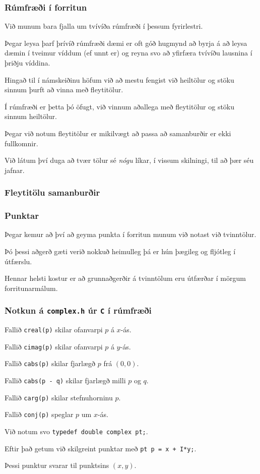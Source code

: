 {
	\frametitle{Rúmfræði í forritun}
	{
		\item<1-> Við munum bara fjalla um tvívíða rúmfræði í þessum fyrirlestri.
		\item<2-> Þegar leysa þarf þrívíð rúmfræði dæmi er oft góð hugmynd að byrja
			á að leysa dæmin í tveimur víddum (ef unnt er) og reyna svo að yfirfæra
			tvívíðu lausnina í þriðju víddina.  \item<3-> Hingað til í námskeiðinu höfum við að mestu fengist við heiltölur
			og stöku sinnum þurft að vinna með fleytitölur.
		\item<4-> Í rúmfræði er þetta þó öfugt, við vinnum aðallega með fleytitölur og stöku sinnum heiltölur.
		\item<5-> Þegar við notum fleytitölur er mikilvægt að passa að samanburðir er ekki fullkomnir.
		\item<6-> Við látum því duga að tvær tölur sé \emph{nógu} líkar, í vissum skilningi, til að þær séu jafnar.
	}
}

{
	\frametitle{Fleytitölu samanburðir}
}

{
	\frametitle{Punktar}
	{
		\item<1-> Þegar kemur að því að geyma punkta í forritun munum við notast við tvinntölur.
		\item<2-> Þó þessi aðgerð gæti verið nokkuð heimulleg þá er hún þægileg og fljótleg í útfærslu.
		\item<3-> Hennar helsti kostur er að grunnaðgerðir á tvinntölum eru útfærðar í mörgum forritunarmálum.
	}
}

{
	\frametitle{Notkun á \texttt{complex.h} úr \texttt{C} í rúmfræði}
	{
		\item<1-> Fallið \texttt{creal(p)} skilar ofanvarpi $p$ á $x$-ás.
		\item<2-> Fallið \texttt{cimag(p)} skilar ofanvarpi $p$ á $y$-ás.
		\item<3-> Fallið \texttt{cabs(p)} skilar fjarlægð $p$ frá $(0, 0)$.
		\item<4-> Fallið \texttt{cabs(p - q)} skilar fjarlægð milli $p$ og $q$.
		\item<5-> Fallið \texttt{carg(p)} skilar stefnuhorninu $p$.
		\item<6-> Fallið \texttt{conj(p)} speglar $p$ um $x$-ás.
	}
}

{
	{
		\item<1-> Við notum svo \texttt{typedef double complex pt;}.
		\item<2-> Eftir það getum við skilgreint punktar með \texttt{pt p = x + I*y;}.
		\item<3-> Þessi punktur svarar til punktsins $(x, y)$.
	}
}

